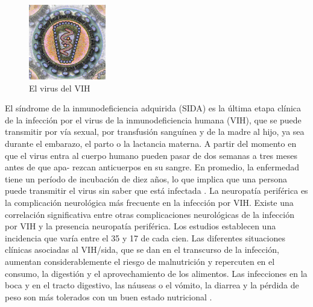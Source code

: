 \documentclass[a4paper,twocolumn,10pt]{article}
\begin{document}
\begin{figure}[htb]
\centering
\includegraphics[width=0.3\textwidth]{./VIH1}
\caption{El virus del VIH {\cite{Wikipedia2018}}}
\label{fig: VIH}
\end{figure}
El síndrome de la inmunodeficiencia adquirida (SIDA) es la última etapa clínica de la infección por el virus de la inmunodeficiencia humana (VIH), que se puede transmitir por vía sexual, por transfusión sanguínea y de la madre al hijo, ya sea durante el embarazo, el parto o la lactancia materna. A partir del momento en que el virus entra al cuerpo humano pueden pasar de dos semanas a tres meses antes de que apa- rezcan anticuerpos en su sangre. En promedio, la enfermedad tiene un período de incubación de diez años, lo que implica que una persona puede transmitir el virus sin saber que está infectada \cite{LinaMariaVera2004}. \newline \newline
La neuropatía periférica es la complicación neurológica más frecuente en la infección por VIH. Existe una correlación significativa entre otras complicaciones neurológicas de la infección por VIH y la presencia neuropatía periférica. Los estudios establecen una incidencia que varía entre el 35 y 17 de cada cien. Las diferentes situaciones clínicas asociadas al VIH/sida, que se dan en el transcurso de la infección, aumentan considerablemente el riesgo de malnutrición y repercuten en el consumo, la digestión y el aprovechamiento de los alimentos. Las infecciones en la boca y en el tracto digestivo, las náuseas o el vómito, la diarrea y la pérdida de peso son más tolerados con un buen estado nutricional \cite{Herrera2004}.
\end{document}
